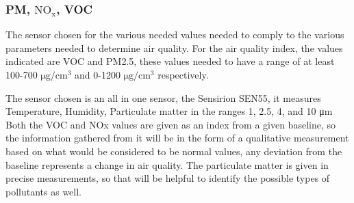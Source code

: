 \subsubsection{PM, $\mathrm{NO_x}$, VOC}
The sensor chosen for the various needed values needed to comply to the various parameters needed to determine air quality. For the air quality index, the values indicated are VOC and PM2.5, these values needed to have a range of at least 100-700 $ \si{\micro\gram}/\si{\centi\meter^3} $ and 0-1200  $ \si{\micro\gram}/\si{\centi\meter^3} $ respectively.

\noindent
The sensor chosen is an all in one sensor, the Sensirion SEN55, it measures Temperature, Humidity, Particulate matter in the ranges 1, 2.5, 4, and 10 \si{\micro\meter}
Both the VOC and NOx values are given as an index from a given baseline, so the information gathered from it will be in the form of a qualitative measurement based on what would be considered to be normal values, any deviation from the baseline represents a change in air quality. The particulate matter is given in precise measurements, so that will be helpful to identify the possible types of pollutants as well.

